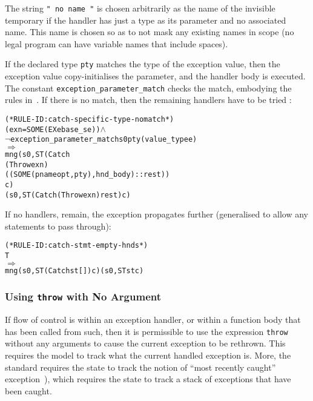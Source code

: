 \documentclass[11pt]{article}
\begin{document}
The string \texttt{" no name "} is chosen arbitrarily as the name of
the invisible temporary if the handler has just a type as its
parameter and no associated name.  This name is chosen so as to not
mask any existing names in scope (no legal \cpp{} program can have
variable names that include spaces).

If the declared type \texttt{pty} matches the type of the exception
value, then the exception value copy-initialises the parameter, and
the handler body is executed.  The constant
\texttt{exception_parameter_match} checks the match, embodying the
rules in~\cite[\S15.3, paragraph 3]{cpp-standard-iso14882}.  If there
is no match, then the remaining handlers have to be tried
:
\begin{center}
  \begin{minipage}{\textwidth}
%
\begin{alltt}
(* RULE-ID: catch-specific-type-nomatch *)
     (exn = SOME (EX e base_se)) \(\land\)
     \(\neg\)exception_parameter_match s0 pty (value_type e)
   \(\Rightarrow\)
     mng (s0, ST (Catch
                    (Throw exn)
                    ((SOME(pnameopt, pty), hnd_body) :: rest))
                 c)
         (s0, ST (Catch (Throw exn) rest) c)
\end{alltt}
  \end{minipage}
\end{center}
If no handlers, remain, the exception propagates further
 (generalised to allow any statements to
pass through):
\begin{center}
  \begin{minipage}{\textwidth}
%
\begin{alltt}
(* RULE-ID: catch-stmt-empty-hnds *)
     T
   \(\Rightarrow\)
     mng (s0, ST (Catch st []) c) (s0, ST st c)
\end{alltt}
  \end{minipage}
\end{center}

\subsubsection{Using \texttt{throw} with No Argument}
\label{sec:throw-none}

If flow of control is within an exception handler, or within a
function body that has been called from such, then it is permissible
to use the expression \texttt{throw} without any arguments to cause
the current exception to be rethrown.  This requires the model to
track what the current handled exception is.  More, the standard
requires the state to track the notion of ``most recently caught''
exception~\cite[\S15.1, paragraph 7]{cpp-standard-iso14882}), which
requires the state to track a stack of exceptions that have been
caught.
\end{document}
